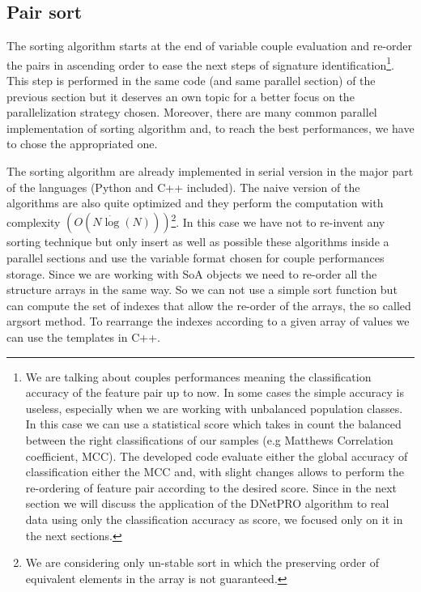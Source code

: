\documentclass{standalone}
\begin{document}
\subsection[Sorting]{Pair sort}\label{implementation:sort}

The sorting algorithm starts at the end of variable couple evaluation and re-order the pairs in ascending order to ease the next steps of signature identification\footnote{
  We are talking about couples performances meaning the classification accuracy of the feature pair up to now.
  In some cases the simple accuracy is useless, especially when we are working with unbalanced population classes.
  In this case we can use a statistical score which takes in count the balanced between the right classifications of our samples (e.g Matthews Correlation coefficient, MCC).
  The developed code evaluate either the global accuracy of classification either the MCC and, with slight changes allows to perform the re-ordering of feature pair according to the desired score.
  Since in the next section we will discuss the application of the DNetPRO algorithm to real data using only the classification accuracy as score, we focused only on it in the next sections.
}.
This step is performed in the same code (and same parallel section) of the previous section but it deserves an own topic for a better focus on the parallelization strategy chosen.
Moreover, there are many common parallel implementation of sorting algorithm and, to reach the best performances, we have to chose the appropriated one.

The sorting algorithm are already implemented in serial version in the major part of the languages (\textsf{Python} and \textsf{C++} included).
The naive version of the algorithms are also quite optimized and they perform the computation with complexity $(O(N\dot\log(N)))$\footnote{
  We are considering only un-stable sort in which the preserving order of equivalent elements in the array is not guaranteed.
}.
In this case we have not to re-invent any sorting technique but only insert as well as possible these algorithms inside a parallel sections and use the variable format chosen for couple performances storage.
Since we are working with SoA objects we need to re-order all the structure arrays in the same way.
So we can not use a simple sort function but can compute the set of indexes that allow the re-order of the arrays, the so called \textsf{argsort} method.
To rearrange the indexes according to a given array of values we can use the templates in \textsf{C++}.
\end{document}

